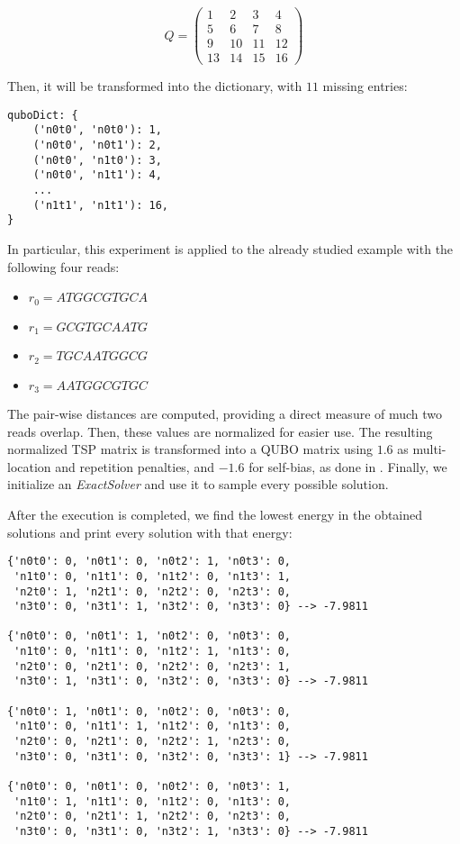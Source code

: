$$
Q = 
\left(
\begin{array}{cccc}
	1 & 2 & 3 & 4 \\
	5 & 6 & 7 & 8 \\
	9 & 10 & 11 & 12 \\
	13 & 14 & 15 & 16 
\end{array}
\right)
$$

Then, it will be transformed into the dictionary, with $11$ missing entries: 

\begin{verbatim}
quboDict: {
	('n0t0', 'n0t0'): 1,
	('n0t0', 'n0t1'): 2,
	('n0t0', 'n1t0'): 3,
	('n0t0', 'n1t1'): 4,
	...
	('n1t1', 'n1t1'): 16,
}
\end{verbatim}

In particular, this experiment is applied to the already studied example with the following four reads:

\begin{itemize}
	\item $r_0 = ATGGCGTGCA$
	\item $r_1 = GCGTGCAATG$
	\item $r_2 = TGCAATGGCG$
	\item $r_3 = AATGGCGTGC$
\end{itemize}

The pair-wise distances are computed, providing a direct measure of much two reads overlap. Then, these values are normalized for easier use. The resulting normalized TSP matrix is transformed into a QUBO matrix using $1.6$ as multi-location and repetition penalties, and $-1.6$ for self-bias, as done in \cite{Sarkar2020}. Finally, we initialize an \emph{ExactSolver} and use it to sample every possible solution.

After the execution is completed, we find the lowest energy in the obtained solutions and print every solution with that energy:

\begin{verbatim}
{'n0t0': 0, 'n0t1': 0, 'n0t2': 1, 'n0t3': 0,
 'n1t0': 0, 'n1t1': 0, 'n1t2': 0, 'n1t3': 1,
 'n2t0': 1, 'n2t1': 0, 'n2t2': 0, 'n2t3': 0,
 'n3t0': 0, 'n3t1': 1, 'n3t2': 0, 'n3t3': 0} --> -7.9811

{'n0t0': 0, 'n0t1': 1, 'n0t2': 0, 'n0t3': 0,
 'n1t0': 0, 'n1t1': 0, 'n1t2': 1, 'n1t3': 0, 
 'n2t0': 0, 'n2t1': 0, 'n2t2': 0, 'n2t3': 1, 
 'n3t0': 1, 'n3t1': 0, 'n3t2': 0, 'n3t3': 0} --> -7.9811

{'n0t0': 1, 'n0t1': 0, 'n0t2': 0, 'n0t3': 0,
 'n1t0': 0, 'n1t1': 1, 'n1t2': 0, 'n1t3': 0, 
 'n2t0': 0, 'n2t1': 0, 'n2t2': 1, 'n2t3': 0, 
 'n3t0': 0, 'n3t1': 0, 'n3t2': 0, 'n3t3': 1} --> -7.9811

{'n0t0': 0, 'n0t1': 0, 'n0t2': 0, 'n0t3': 1,
 'n1t0': 1, 'n1t1': 0, 'n1t2': 0, 'n1t3': 0,
 'n2t0': 0, 'n2t1': 1, 'n2t2': 0, 'n2t3': 0,
 'n3t0': 0, 'n3t1': 0, 'n3t2': 1, 'n3t3': 0} --> -7.9811
\end{verbatim}

